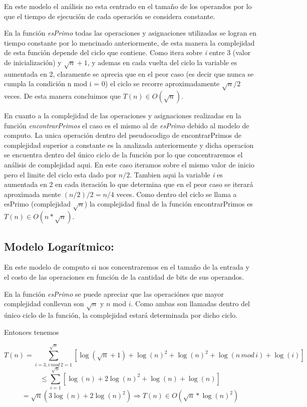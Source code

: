 \documentclass[a4paper,10pt] {article}
\begin{document}
En este modelo el an\'alisis no esta centrado en el tama\~{n}o de los operandos
por lo que el tiempo de ejecuci\'on de cada operaci\'on se considera constante.

En la funci\'on \textit{esPrimo} todas las operaciones y asignaciones utilizadas se
logran en tiempo constante por lo mencinado anteriormente, de esta manera la
complejidad de esta funci\'on depende del ciclo que contiene. Como itera sobre
\textit{i} entre 3 (valor de inicializaci\'on) y $\sqrt{n}+1$, y ademas en cada
vuelta del ciclo la variable es aumentada en 2, claramente se aprecia que en el
peor caso (es decir que nunca se cumpla la condici\'on n mod i = 0) el ciclo se
recorre aproximadamente $\sqrt{n}/2$ veces. De esta manera concluimos que $T(n)
\in O(\sqrt{n})$.

En cuanto a la complejidad de las operaciones y asignaciones realizadas en la
funci\'on \textit{encontrarPrimos} el caso es el mismo al de \textit{esPrimo} debido al modelo de
computo. La unica operaci\'on dentro del pseudocodigo de encontrarPrimos de
complejidad superior a constante es la analizada anteriormente y dicha operacion se
encuentra dentro del \'unico ciclo de la funci\'on por lo que concentraremos el
an\'alisis de complejidad aqui. En este caso iteramos sobre el mismo valor de
inicio pero el limite del ciclo esta dado por $n/2$. Tambien aqui la variable
\textit{i} es aumentada en 2 en cada iteraci\'on lo que determina que en el peor
caso se iterar\'a aproximada mente $(n/2)/2 = n/4$ veces. Como dentro del ciclo
se llama a esPrimo (complejidad $\sqrt{n}$) la complejidad final de la funci\'on
encontrarPrimos es $T(n) \in O(n*\sqrt{n})$.

\subsection*{Modelo Logar\'itmico:}

En este modelo de computo si nos concentraremos en el tama\~{n}o de la entrada y
el costo de las operaciones en funci\'on de la cantidad de bits de sus
operandos.

En la funci\'on \textit{esPrimo} se puede apreciar que las operaci\'ones que mayor
complejidad conllevan son $\sqrt{n}$ y $n$ mod $i$. Como ambas son llamadas
dentro del \'unico ciclo de la funci\'on, la complejidad estar\'a determinada
por dicho ciclo.

Entonces tenemos 

$$ T(n) = \sum_{i=3,i\,mod\,2=1}^{\sqrt{n}}
[\log(\sqrt{n}+1)+\log(n)^{2}+\log(n)^{2}+\log(n\,mod\,i)+\log(i)] $$
$$\leq \sum_{i=1}^{\sqrt{n}} [\log(n)+2\log(n)^{2}+\log(n)+\log(n)] $$
$$= \sqrt{n}(3\log(n)+2\log(n)^{2}) \Longrightarrow T(n) \in O(\sqrt{n}*\log(n)^{2})$$
\end{document}
